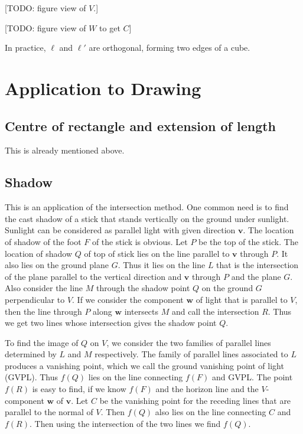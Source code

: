 \documentclass{amsart}
\newcommand {\bv} {\mathbf {v}}
\newcommand {\bw} {\mathbf {w}}
\begin{document}
[TODO: figure view of $V$.]

[TODO: figure view of $W$ to get $C$]

In practice, $\ell$ and $\ell'$ are orthogonal, forming two edges of a cube.

\section{Application to Drawing}
\label{sec:application-drawing}

\subsection{Centre of rectangle and extension of length}
\label{sec:centre-rect-extens}

This is already mentioned above.

\subsection{Shadow}
\label{sec:shadow}

This is an application of the intersection method. One common need is to find the cast shadow of a stick that stands vertically on the ground under sunlight. Sunlight can be considered as parallel light with given direction $\bv$. The location of shadow of the foot $F$ of the stick is obvious. Let $P$ be the top of the stick. The location of shadow $Q$ of top of stick lies on the line parallel to $\bv$ through $P$. It also lies on the ground plane $G$. Thus it lies on the line $L$ that is the intersection of the plane parallel to the vertical direction and $\bv$ through $P$ and the plane $G$. Also consider the line $M$ through the shadow point $Q$ on the ground $G$ perpendicular to $V$. If we consider the component $\bw$ of light that is parallel to $V$, then the line through $P$ along $\bw$ intersects $M$ and call the intersection $R$. Thus we get two lines whose intersection gives the shadow point $Q$.

To find the image of $Q$ on $V$, we consider the two families of parallel lines determined by $L$ and $M$ respectively. The family of parallel lines associated to $L$ produces a vanishing point, which we call the ground vanishing point of light (GVPL). Thus $f (Q)$ lies on the line connecting $f (F)$ and GVPL. The point $f (R)$ is easy to find, if we know $f (F)$ and the horizon line and the $V$-component $\bw$ of $\bv$. Let $C$ be the vanishing point for the receding lines that are parallel to the normal of $V$. Then $f (Q)$ also lies on the line connecting $C$ and $f (R)$. Then using the intersection of the two lines we find $f (Q)$.
\end{document}
